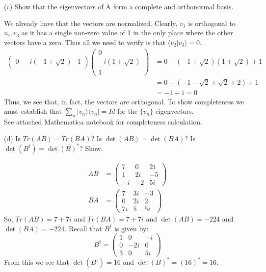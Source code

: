 \documentclass[a4paper, 11pt]{article}
\newcommand{\ket}[1]{|#1\rangle}
\newcommand{\bra}[1]{\langle #1 |}
\newcommand{\braket}[2]{\langle #1 | #2 \rangle}
\newenvironment{solution}{%
	\begin{list}{}{%
			\setlength{\topsep}{0pt}%
			\setlength{\leftmargin}{1.5cm}%
			\setlength{\rightmargin}{1.5cm}%
			\setlength{\listparindent}{\parindent}%
			\setlength{\itemindent}{\parindent}%
			\setlength{\parsep}{\parskip}%
	}%
	\item[]}{\end{list}}
\begin{document}
\noindent(c) Show that the eigenvectors of A form a complete and orthonormal basis. \\
	\begin{solution}
		\noindent We already have that the vectors are normalized. Clearly, $\mathit{v}_1$ is orthogonal to $\mathit{v}_2, \mathit{v}_3$ as it has a single non-zero value of 1 in the only place where the other vectors have a zero. Thus all we need to verify is that $\braket{\mathit{v}_2}{\mathit{v}_3} = 0$. 
			\begin{align*}
				\begin{pmatrix}0 & -i(-1+\sqrt{2}) & 1\end{pmatrix}	\begin{pmatrix}0 \\ -i(1+\sqrt{2}) \\ 1\end{pmatrix} &= 0 - (-1+\sqrt{2})(1+\sqrt{2}) + 1 \\ 
				 &= 0-(-1-\sqrt{2}+\sqrt{2}+2)+1 \\ 
				 &= -1+1 = 0 
			\end{align*}
		Thus, we see that, in fact, the vectors are orthogonal. To show completeness we must establish that $\sum_n \ket{\mathit{v}_n}\bra{\mathit{v}_n} = Id$ for the $\{\mathit{v}_n\}$ eigenvectors.\\ 
		
		See attached Mathematica notebook for completeness calculation. \\
	\end{solution}

\noindent(d) Is $Tr(AB) = Tr(BA)$? Is $\det(AB) =\det(BA)$? Is $\det(B^\dagger) = \det(B)^*$? Show. 
	\begin{solution}
	\begin{align*}
		AB &= \begin{pmatrix}
			7 & 0 & 21 \\ 
			1 & 2i & -5 \\ 
			-i & -2 & 5i
		\end{pmatrix} \\ 
		BA &= \begin{pmatrix}
			7 & 3i & -3 \\ 
			0 & 2i & 2 \\ 
			7i & 5 & 5i
		\end{pmatrix}
	\end{align*}
	\noindent So, $Tr(AB) = 7+7i$ and $Tr(BA) = 7 + 7i$ and $\det(AB) = -224$ and $\det(BA) = -224$. Recall that $B^\dagger$ is given by: 
		\begin{equation*}
			B^\dagger = \begin{pmatrix}1 & 0 & -i \\ 0 & -2i & 0 \\ 3 & 0 & 5i \end{pmatrix}
		\end{equation*}
	From this we see that $\det(B^\dagger) = 16$ and $\det(B)^* = (16)^* = 16$. \\
	\end{solution}
\end{document}
